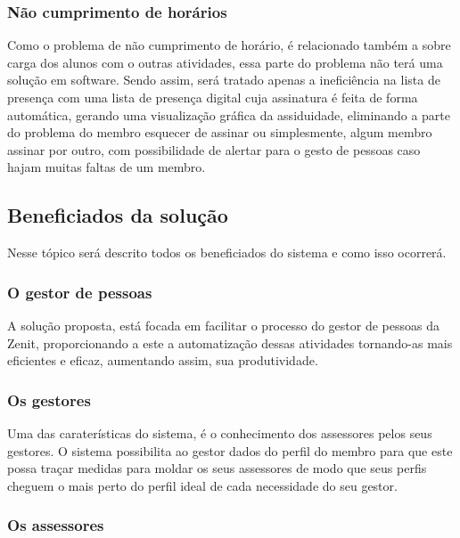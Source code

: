 \begin{anexosenv}
\subsubsection[Não cumprimento de horários]{Não cumprimento de horários}

Como o problema de não cumprimento de horário, é relacionado também a sobre carga dos alunos com o outras atividades, essa parte do problema não terá uma solução em software. Sendo assim, será tratado apenas a ineficiência na lista de presença com uma lista de presença digital cuja assinatura é feita de forma automática, gerando uma visualização gráfica da assiduidade, eliminando a parte do problema do membro esquecer de assinar ou simplesmente, algum membro assinar por outro, com possibilidade de alertar para o gesto de pessoas caso hajam muitas faltas de um membro.\\

\subsection[Beneficiados da solução]{Beneficiados da solução}

Nesse tópico será descrito todos os beneficiados do sistema e como isso ocorrerá.\\


\subsubsection[O gestor de pessoas]{O gestor de pessoas}

A solução proposta, está focada em facilitar o processo do gestor de pessoas da Zenit, proporcionando a este a automatização dessas atividades tornando-as mais eficientes e eficaz, aumentando assim, sua produtividade.\\

\subsubsection[Os gestores]{Os gestores}

Uma das caraterísticas do sistema, é o conhecimento dos assessores pelos seus gestores. O sistema possibilita ao gestor dados do perfil do membro para que este  possa traçar medidas para moldar os seus assessores de modo que seus perfis  cheguem o mais perto do perfil ideal de cada necessidade do seu gestor.\\

\subsubsection[Os assessores]{Os assessores}


\end{anexosenv}
